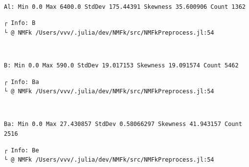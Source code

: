 \documentclass[11pt]{article}
\begin{document}
    \begin{center}
    \end{center}
    { \hspace*{\fill} \\}

    \begin{Verbatim}[commandchars=\\\{\}]
Al: Min 0.0 Max 6400.0 StdDev 175.44391 Skewness 35.600906 Count 1362
    \end{Verbatim}

    \begin{Verbatim}[commandchars=\\\{\}]
┌ Info: B
└ @ NMFk /Users/vvv/.julia/dev/NMFk/src/NMFkPreprocess.jl:54
    \end{Verbatim}

    \begin{center}
    \end{center}
    { \hspace*{\fill} \\}

    \begin{Verbatim}[commandchars=\\\{\}]
B: Min 0.0 Max 590.0 StdDev 19.017153 Skewness 19.091574 Count 5462
    \end{Verbatim}

    \begin{Verbatim}[commandchars=\\\{\}]
┌ Info: Ba
└ @ NMFk /Users/vvv/.julia/dev/NMFk/src/NMFkPreprocess.jl:54
    \end{Verbatim}

    \begin{center}
    \end{center}
    { \hspace*{\fill} \\}

    \begin{Verbatim}[commandchars=\\\{\}]
Ba: Min 0.0 Max 27.430857 StdDev 0.58066297 Skewness 41.943157 Count 2516
    \end{Verbatim}

    \begin{Verbatim}[commandchars=\\\{\}]
┌ Info: Be
└ @ NMFk /Users/vvv/.julia/dev/NMFk/src/NMFkPreprocess.jl:54
    \end{Verbatim}
\end{document}
